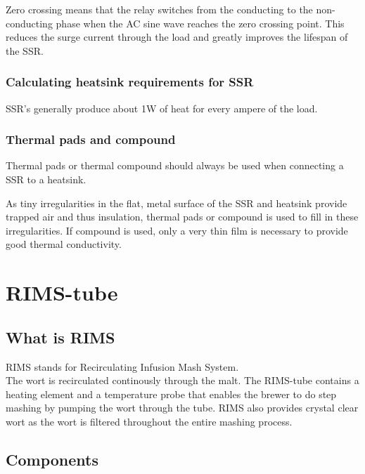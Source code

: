 \documentclass[11pt,fleqn,openany]{book} %
\begin{document}
Zero crossing means that the relay switches from the conducting to the non-conducting phase when the AC sine wave reaches the zero crossing point. This reduces the surge current through the load and greatly improves the lifespan of the SSR.

\subsection{Calculating heatsink requirements for SSR}

SSR's generally produce about 1W of heat for every ampere of the load.

\subsection{Thermal pads and compound}

Thermal pads or thermal compound should always be used when connecting a SSR to a heatsink.

As tiny irregularities in the flat, metal surface of the SSR and heatsink provide trapped air and thus insulation, thermal pads or compound is used to fill in these irregularities. If compound is used, only a very thin film is necessary to provide good thermal conductivity.



\chapter{RIMS-tube}

\section{What is RIMS}

RIMS stands for Recirculating Infusion Mash System.\\
The wort is recirculated continously through the malt. The RIMS-tube contains a heating element and a temperature probe that enables the brewer to do step mashing by pumping the wort through the tube. RIMS also provides crystal clear wort as the wort is filtered throughout the entire mashing process.

\section{Components}
\end{document}

